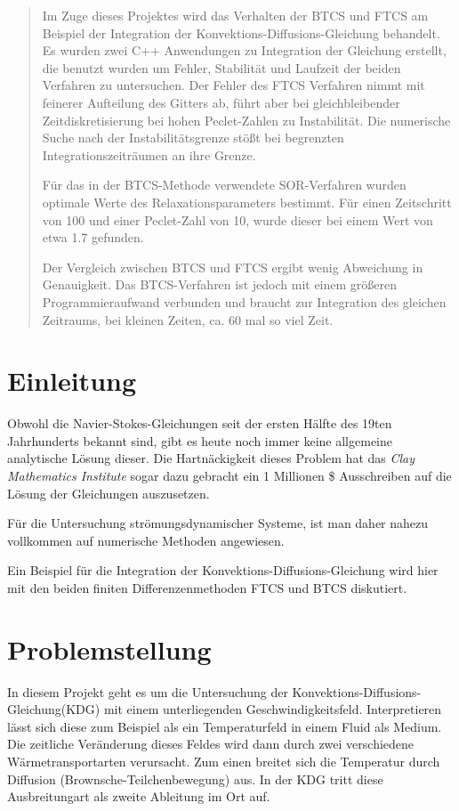 \begin{abstract}
Im Zuge dieses Projektes wird das Verhalten der BTCS und FTCS am Beispiel der Integration der Konvektions-Diffusions-Gleichung behandelt. Es wurden zwei C++ Anwendungen zu Integration der Gleichung erstellt, die benutzt wurden um Fehler, Stabilität und Laufzeit der beiden Verfahren zu untersuchen. Der Fehler des FTCS Verfahren nimmt mit feinerer Aufteilung des Gitters ab, führt aber bei gleichbleibender Zeitdiskretisierung bei hohen Peclet-Zahlen zu Instabilität. Die numerische Suche nach der Instabilitätsgrenze stößt bei begrenzten Integrationszeiträumen an ihre Grenze.

Für das in der BTCS-Methode verwendete SOR-Verfahren wurden optimale Werte des Relaxationsparameters bestimmt. Für einen Zeitschritt von 100 und einer Peclet-Zahl von 10, wurde dieser bei einem Wert von etwa 1.7 gefunden.

Der Vergleich zwischen BTCS und FTCS ergibt wenig Abweichung in Genauigkeit. Das BTCS-Verfahren ist jedoch mit einem größeren Programmieraufwand verbunden und braucht zur Integration des gleichen Zeitraums, bei kleinen Zeiten, ca. 60 mal so viel Zeit.
\end{abstract}

\section{Einleitung}
Obwohl die Navier-Stokes-Gleichungen seit der ersten Hälfte des 19ten Jahrhunderts bekannt sind, gibt es heute noch immer keine allgemeine analytische Lösung dieser.
Die Hartnäckigkeit dieses Problem hat das \emph{Clay Mathematics Institute} sogar dazu gebracht ein 1 Millionen \$ Ausschreiben auf die Lösung der Gleichungen auszusetzen.

Für die Untersuchung strömungsdynamischer Systeme, ist man daher nahezu vollkommen auf numerische Methoden angewiesen.

Ein Beispiel für die Integration der Konvektions-Diffusions-Gleichung wird hier mit den beiden finiten Differenzenmethoden FTCS und BTCS
diskutiert.

\newpage
\section{Problemstellung}
In diesem Projekt geht es um die Untersuchung der Konvektions-Diffusions-Gleichung(KDG) mit einem unterliegenden Geschwindigkeitsfeld.
Interpretieren lässt sich diese zum Beispiel als ein Temperaturfeld in einem Fluid als Medium.
Die zeitliche Veränderung dieses Feldes wird dann durch zwei verschiedene Wärmetransportarten verursacht.
Zum einen breitet sich die Temperatur durch Diffusion (Brownsche-Teilchenbewegung) aus. In der KDG tritt diese Ausbreitungart als zweite Ableitung im Ort auf.

